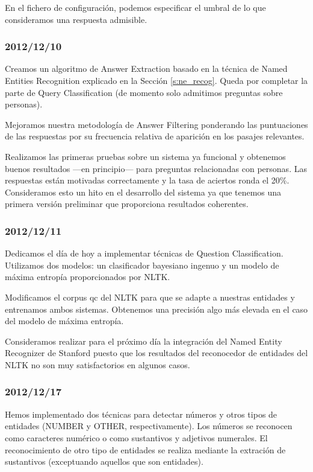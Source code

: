\documentclass[12pt,a4paper,titlepage]{article}
\begin{document}
En el fichero de configuración, podemos especificar el umbral de lo que consideramos una respuesta admisible.

\subsubsection*{2012/12/10}
Creamos un algoritmo de Answer Extraction basado en la técnica de Named Entities Recognition explicado en la Sección \ref{s:ne_recog}. Queda por completar la parte de Query Classification (de momento solo admitimos preguntas sobre personas).

Mejoramos nuestra metodología de Answer Filtering ponderando las puntuaciones de las respuestas por su frecuencia relativa de aparición en los pasajes relevantes.

Realizamos las primeras pruebas sobre un sistema ya funcional y obtenemos buenos resultados ---en principio--- para preguntas relacionadas con personas. Las respuestas están motivadas correctamente y la tasa de aciertos ronda el 20\%. Consideramos esto un hito en el desarrollo del sistema ya que tenemos una primera versión preliminar que proporciona resultados coherentes.

\subsubsection*{2012/12/11}
Dedicamos el día de hoy a implementar técnicas de Question Classification. Utilizamos dos modelos: un clasificador bayesiano ingenuo y un modelo de máxima entropía proporcionados por NLTK.

Modificamos el corpus qc del NLTK para que se adapte a nuestras entidades y entrenamos ambos sistemas. Obtenemos una precisión algo más elevada en el caso del modelo de máxima entropía.

Consideramos realizar para el próximo día la integración del Named Entity Recognizer de Stanford puesto que los resultados del reconocedor de entidades del NLTK no son muy satisfactorios en algunos casos.

\subsubsection*{2012/12/17}
Hemos implementado dos técnicas para detectar números y otros tipos de entidades (NUMBER y OTHER, respectivamente). Los números se reconocen como caracteres numérico o como sustantivos y adjetivos numerales. El reconocimiento de otro tipo de entidades se realiza mediante la extración de sustantivos (exceptuando aquellos que son entidades).
\end{document}
